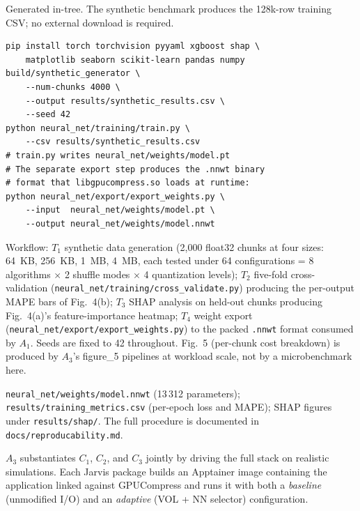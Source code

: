 \documentclass[conference]{IEEEtran}
\begin{document}
Generated in-tree. The synthetic benchmark produces the 128k-row
training CSV; no external download is required.

\begin{verbatim}
pip install torch torchvision pyyaml xgboost shap \
    matplotlib seaborn scikit-learn pandas numpy
build/synthetic_generator \
    --num-chunks 4000 \
    --output results/synthetic_results.csv \
    --seed 42
python neural_net/training/train.py \
    --csv results/synthetic_results.csv
# train.py writes neural_net/weights/model.pt
# The separate export step produces the .nnwt binary
# format that libgpucompress.so loads at runtime:
python neural_net/export/export_weights.py \
    --input  neural_net/weights/model.pt \
    --output neural_net/weights/model.nnwt
\end{verbatim}

Workflow:
$T_1$ synthetic data generation (2{,}000 float32 chunks at
four sizes: 64~KB, 256~KB, 1~MB, 4~MB, each tested under 64
configurations = 8 algorithms $\times$ 2 shuffle modes
$\times$ 4 quantization levels);
$T_2$ five-fold cross-validation
(\texttt{neural\_net/training/cross\_validate.py}) producing
the per-output MAPE bars of Fig.~4(b);
$T_3$ SHAP analysis on held-out chunks producing Fig.~4(a)'s
feature-importance heatmap;
$T_4$ weight export
(\texttt{neural\_net/export/export\_weights.py}) to the packed
\texttt{.nnwt} format consumed by $A_1$. Seeds are fixed to
42 throughout. Fig.~5 (per-chunk cost breakdown) is produced
by $A_3$'s figure\_5 pipelines at workload scale, not by a
microbenchmark here.

\artout
\texttt{neural\_net/weights/model.nnwt} (13\,312 parameters);
\texttt{results/training\_metrics.csv} (per-epoch loss and MAPE);
SHAP figures under \texttt{results/shap/}. The full procedure is
documented in \texttt{docs/reproducability.md}.


\newartifact

\artrel
$A_3$ substantiates $C_1$, $C_2$, and $C_3$ jointly by driving
the full stack on realistic simulations. Each Jarvis package
builds an Apptainer image containing the application linked
against GPUCompress and runs it with both a \emph{baseline}
(unmodified I/O) and an \emph{adaptive} (VOL + NN selector)
configuration.
\end{document}
